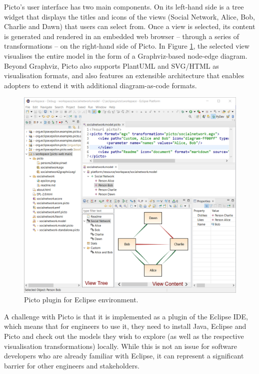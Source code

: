 \documentclass[sigconf,review]{acmart}
\begin{document}
Picto’s user interface has two main components. On its left-hand side is a tree widget that displays the titles and icons of the views (Social Network, Alice, Bob, Charlie and Dawn) that users can select from. Once a view is selected, its content is generated and rendered in an embedded web browser -- through a series of transformations -- on the right-hand side of Picto. In Figure \ref{fig:picto-eclipse}, the selected view visualises the entire model in the form of a Graphviz-based node-edge diagram. Beyond Graphviz, Picto also supports PlantUML and SVG/HTML as visualisation formats, and also features an extensible architecture that enables adopters to extend it with additional diagram-as-code formats.  

\begin{figure}
  \centering
  \includegraphics[width=\linewidth]{images/picto-eclipse.png}
  \caption{Picto plugin for Eclipse environment.}
  \label{fig:picto-eclipse}
\end{figure}

A challenge with Picto is that it is implemented as a plugin of the Eclipse IDE, which means that for engineers to use it, they need to install Java, Eclipse and Picto and check out the models they wish to explore (as well as the respective visualisation transformations) locally. While this is not an issue for software developers who are already familiar with Eclipse, it can represent a significant barrier for other engineers and stakeholders. %
\end{document}
